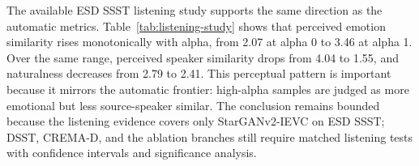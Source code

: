 The available ESD SSST listening study supports the same direction as the automatic metrics.
Table~\ref{tab:listening-study} shows that perceived emotion similarity rises monotonically with alpha, from 2.07 at alpha 0 to 3.46 at alpha 1.
Over the same range, perceived speaker similarity drops from 4.04 to 1.55, and naturalness decreases from 2.79 to 2.41.
This perceptual pattern is important because it mirrors the automatic frontier: high-alpha samples are judged as more emotional but less source-speaker similar.
The conclusion remains bounded because the listening evidence covers only StarGANv2-IEVC on ESD SSST; DSST, CREMA-D, and the ablation branches still require matched listening tests with confidence intervals and significance analysis.
